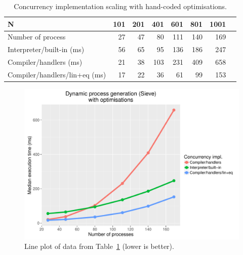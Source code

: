\documentclass[12pt,mscres,cdtppar,twoside,openright,logo,rightchapter,normalheadings]{infthesis}
\theoremstyle{definition}
\begin{document}
\begin{table}[H]
\centering
\begin{tabular}{| l | r | r | r | r | r | r | r |}
\hline
N  & 101 & 201 & 401 & 601 & 801 & 1001 \\
\hline
Number of process & 27 & 47 & 80 & 111 & 140 & 169 \\
\hline
\hline
  Interpreter/built-in (ms) & 56 & 65 & 95 & 136 & 186 & 247 \\
\hline
  Compiler/handlers (ms) & 21 & 38 & 103 & 231  & 409  & 658  \\
\hline 
  Compiler/handlers/lin+eq (ms) & 17 & 22 & 36 & 61 & 99 & 153 \\
\hline
\end{tabular}
\caption{Concurrency implementation scaling with hand-coded optimisations.}\label{tbl:sieve-recovered}
\end{table}

\begin{figure}[H]
\centering
\includegraphics[scale=0.55]{plots/sieve_recovered.pdf}
\caption{Line plot of data from Table~\ref{tbl:sieve-recovered} (lower
  is better).}\label{fig:sieve-recovered-plot}
\end{figure}

\end{document}
